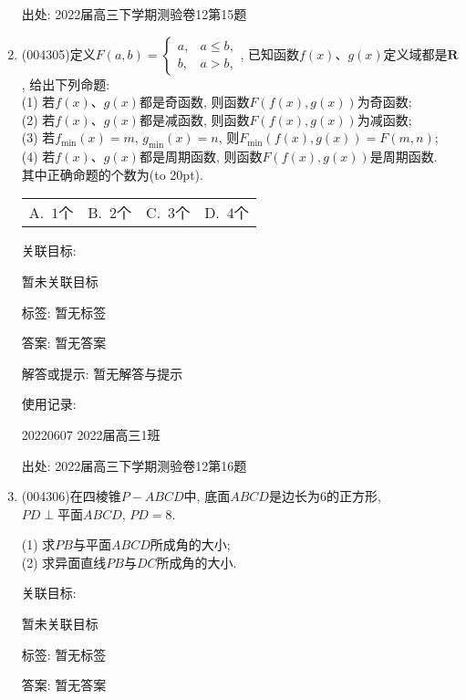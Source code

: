 \documentclass[10pt,a4paper]{article}
\newcommand{\bracket}[1]{(\hbox to #1pt{})}
\newcommand{\fourch}[4]{\par\begin{tabular}{p{.23\textwidth}p{.23\textwidth}p{.23\textwidth}p{.23\textwidth}}
A.~#1 &B.~#2& C.~#3& D.~#4
\end{tabular}}
\begin{document}
\begin{enumerate}[1.]
出处: 2022届高三下学期测验卷12第15题
\item { (004305)}定义$F(a,b)=\begin{cases} a, & a \le b, \\ b, & a>b,\end{cases}$, 已知函数$f(x)$、$g(x)$定义域都是$\mathbf{R}$, 给出下列命题:\\
(1) 若$f(x)$、$g(x)$都是奇函数, 则函数$F(f(x),g(x))$为奇函数;\\
(2) 若$f(x)$、$g(x)$都是减函数, 则函数$F(f(x),g(x))$为减函数;\\
(3) 若$f_{\min}(x)=m$, $g_{\min}(x)=n$, 则$F_{\min}(f(x),g(x))=F(m,n)$;\\
(4) 若$f(x)$、$g(x)$都是周期函数, 则函数$F(f(x),g(x))$是周期函数.\\
其中正确命题的个数为\bracket{20}.
\fourch{$1$个}{$2$个}{$3$个}{$4$个}


关联目标:

暂未关联目标



标签: 暂无标签

答案: 暂无答案

解答或提示: 暂无解答与提示

使用记录:

20220607	2022届高三1班	


出处: 2022届高三下学期测验卷12第16题
\item { (004306)}在四棱锥$P-ABCD$中, 底面$ABCD$是边长为$6$的正方形, $PD\perp \text{平面}ABCD$, $PD=8$.\\
\begin{center}
\end{center}
(1) 求$PB$与平面$ABCD$所成角的大小;\\
(2) 求异面直线$PB$与$DC$所成角的大小.


关联目标:

暂未关联目标



标签: 暂无标签

答案: 暂无答案


\end{enumerate}
\end{document}
